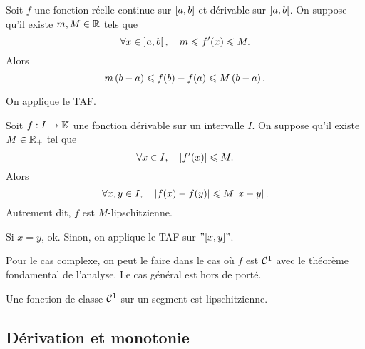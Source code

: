 \documentclass{magnolia}
\begin{document}
\begin{proposition}[utile=-3,nom={Inégalité des accroissements finis}]
Soit $f$ une fonction réelle continue sur $\left[a,b\right]$ et
dérivable sur $\left]a,b\right[$. On suppose qu'il existe $m,M\in\mathbb{R}$ tels que
\[\forall x\in\left]a,b\right[ ,\quad m\leqslant f'(x)\leqslant M.\]
 Alors
\[m\left(b-a\right)\leqslant f(b)-f(a)\leqslant M\left(b-a\right).\]
\end{proposition}

\begin{preuve}
On applique le TAF.
\end{preuve}

\begin{proposition}[nom={Inégalité des accroissements finis}]
Soit $f:I\to\mathbb{K}$ une fonction dérivable sur un intervalle $I$.
On suppose qu'il existe $M\in\mathbb{R}_+$ tel que
\[\forall x\in I ,\quad \left|f'(x)\right|\leqslant M.\]
Alors
\[\forall x, y\in I,\quad \left|f(x)-f(y)\right|\leqslant M\left|x-y\right|.\]
Autrement dit, $f$ est $M$-lipschitzienne.
\end{proposition}

\begin{preuve}
  Si $x=y$, ok. Sinon, on applique le TAF sur $"[x,y]"$.
  
  Pour le cas complexe, on peut le faire dans le cas où $f$ est $\mathcal{C}^{1}$ avec le théorème fondamental de l'analyse. Le cas général est hors de porté.
  \end{preuve}

\begin{remarqueUnique}
\remarque Une fonction de classe $\mathcal{C}^{1}$ sur un segment est
  lipschitzienne.
\end{remarqueUnique}


\subsection{Dérivation et monotonie}
\end{document}
